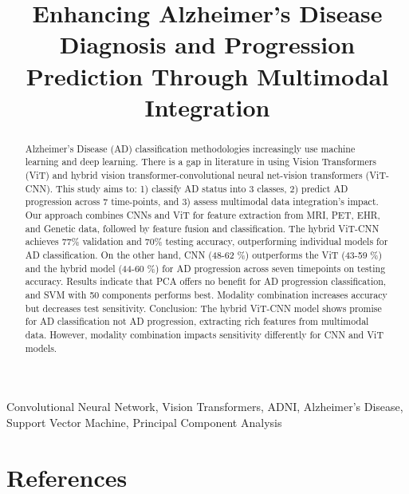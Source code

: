 \documentclass[journal,twoside,web]{ieeecolor}
\begin{document}
\title{Enhancing Alzheimer's Disease Diagnosis and Progression Prediction Through Multimodal Integration}


\maketitle

\begin{abstract}
Alzheimer’s Disease (AD) classification methodologies increasingly use machine learning and deep learning. There is a gap in literature in using Vision Transformers (ViT) and hybrid vision transformer-convolutional neural net-vision transformers (ViT-CNN). This study aims to: 1) classify AD status into 3 classes, 2) predict AD progression across 7 time-points, and 3) assess multimodal data integration's impact. Our approach combines CNNs and ViT for feature extraction from MRI, PET, EHR, and Genetic data, followed by feature fusion and classification. The hybrid ViT-CNN achieves 77\% validation and 70\% testing accuracy, outperforming individual models for AD classification. On the other hand, CNN (48-62 \%) outperforms the ViT (43-59 \%)  and the hybrid model (44-60 \%) for AD progression across seven timepoints on testing accuracy.  
Results indicate that PCA offers no benefit for AD progression classification, and SVM with 50 components performs best. Modality combination increases accuracy but decreases test sensitivity. Conclusion: The hybrid ViT-CNN model shows promise for AD classification not AD progression, extracting rich features from multimodal data. However, modality combination impacts sensitivity differently for CNN and ViT models.
\end{abstract}

\begin{IEEEkeywords}
Convolutional Neural Network, Vision Transformers, ADNI, Alzheimer's Disease, Support Vector Machine, Principal Component Analysis\
\end{IEEEkeywords}


\vspace{-3mm}

% 


\vspace{-3mm}


\vspace{-3mm}


\vspace{-3mm}


\vspace{-3mm}

\section{References}


\end{document}
